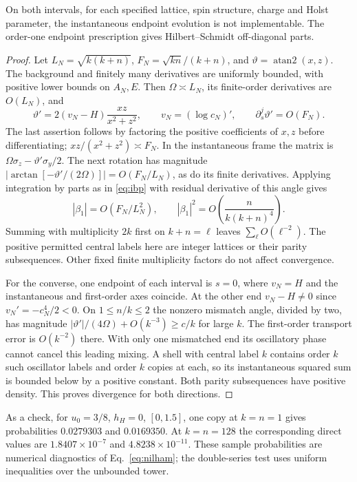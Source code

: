 \begin{proposition}
On both intervals, for each specified lattice, spin structure, charge and Holst parameter, the instantaneous endpoint evolution is not implementable. The order-one endpoint prescription gives Hilbert--Schmidt off-diagonal parts.
\end{proposition}
\begin{proof}
Let $L_N=\sqrt{k(k+n)}$, $F_N=\sqrt{kn}/(k+n)$, and $\vartheta=\operatorname{atan2}(x,z)$. The background and finitely many derivatives are uniformly bounded, with positive lower bounds on $A_N,E$. Then $\Omega\asymp L_N$, its finite-order derivatives are $O(L_N)$, and
\[
 \vartheta'=2(v_N-H)\frac{xz}{x^2+z^2},\qquad v_N=(\log c_N)',
 \qquad \partial_s^j\vartheta'=O(F_N).
\]
The last assertion follows by factoring the positive coefficients of $x,z$ before differentiating; $xz/(x^2+z^2)\asymp F_N$. In the instantaneous frame the matrix is $\Omega\sigma_z-\vartheta'\sigma_y/2$. The next rotation has magnitude $|\arctan[-\vartheta'/(2\Omega)]|=O(F_N/L_N)$, as do its finite derivatives. Applying integration by parts as in \eqref{eq:ibp} with residual derivative of this angle gives
\[
 |\beta_1|=O(F_N/L_N^2),\qquad
 |\beta_1|^2=O\!\left(\frac{n}{k(k+n)^4}\right).
\]
Summing with multiplicity $2k$ first on $k+n=\ell$ leaves $\sum_{\ell}O(\ell^{-2})$. The positive permitted central labels here are integer lattices or their parity subsequences. Other fixed finite multiplicity factors do not affect convergence.

For the converse, one endpoint of each interval is $s=0$, where $v_N=H$ and the instantaneous and first-order axes coincide. At the other end $v_N-H\ne0$ since $v_N'=-c_N^4/2<0$. On $1\le n/k\le2$ the nonzero mismatch angle, divided by two, has magnitude $|\vartheta'|/(4\Omega)+O(k^{-3})\ge c/k$ for large $k$. The first-order transport error is $O(k^{-2})$ there. With only one mismatched end its oscillatory phase cannot cancel this leading mixing. A shell with central label $k$ contains order $k$ such oscillator labels and order $k$ copies at each, so its instantaneous squared sum is bounded below by a positive constant. Both parity subsequences have positive density. This proves divergence for both directions.
\end{proof}
As a check, for $u_0=3/8$, $h_H=0$, $[0,1.5]$, one copy at $k=n=1$ gives probabilities $0.0279303$ and $0.0169350$. At $k=n=128$ the corresponding direct values are $1.8407\times10^{-7}$ and $4.8238\times10^{-11}$. These sample probabilities are numerical diagnostics of Eq.~\eqref{eq:nilham}; the double-series test uses uniform inequalities over the unbounded tower.
